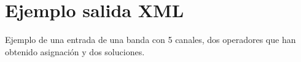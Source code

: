 

\section*{Ejemplo salida XML} \label{ejemploSalida}
Ejemplo de una entrada de una banda con 5 canales, dos operadores que han obtenido asignación y dos soluciones.


